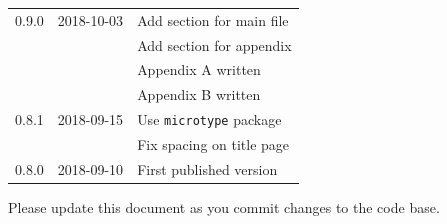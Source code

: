 \begin{longtable}{lll}
    0.9.0 & 2018-10-03
          & Add section for main file\\
         && Add section for appendix\\
         && Appendix A written\\
         && Appendix B written\\
    0.8.1 & 2018-09-15
          & Use \texttt{microtype} package\\
         && Fix spacing on title page\\
    0.8.0 & 2018-09-10
          & First published version\\
    \bottomrule
\end{longtable}

Please update this document as you commit changes to the code base.

